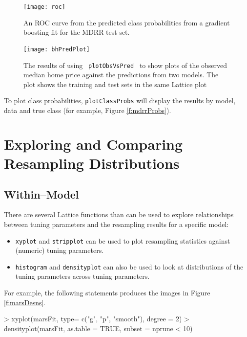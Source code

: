 \documentclass[12pt]{article}
\newcommand{\code}[1]{\mbox{\footnotesize\color{darkblue}\texttt{#1}}}
\renewenvironment{Schunk}{\vspace{\topsep}}{\vspace{\topsep}}
\begin{document}
\begin{figure}
   \begin{center}         
       \texttt{[image: roc]}   
      \caption{An ROC curve from the predicted class probabilities from a gradient boosting fit for the MDRR test set. }
      \label{f:mdrrROC}       
   \end{center}
\end{figure}  

\begin{figure}
   \begin{center}      
      \texttt{[image: bhPredPlot]}   
      \caption{The results of using \code{ plotObsVsPred } to show
        plots of the observed median home price against the
        predictions from two models. The plot shows the training and
        test sets in the same Lattice plot} 
      \label{f:bhPredPlot}         
   \end{center}
\end{figure}


To plot class probabilities, \code{plotClassProbs} will display the
results by model, data and true class (for example, Figure
\ref{f:mdrrProbs}).      

\clearpage

\section{Exploring and Comparing Resampling Distributions}

\subsection{Within--Model}\label{S:withinMod}

There are several Lattice functions than can be used to explore
relationships between tuning parameters and the resampling results for
a specific model:
\begin{itemize}
\item \code{xyplot} and \code{stripplot} can be used to plot resampling statistics
  against (numeric) tuning parameters.
  \item \code{histogram} and \code{densityplot} can also be used
      to look at distributions of the tuning parameters across tuning parameters.
\end{itemize}

For example, the following statements produces the images in Figure \ref{f:marsDesns}.   

\begin{small}
\begin{Schunk}
\begin{Sinput}
> xyplot(marsFit, type= c("g", "p", "smooth"), degree = 2)
> densityplot(marsFit, as.table = TRUE, subset = nprune < 10)
\end{Sinput}
\end{Schunk}
\end{small}
\end{document}
